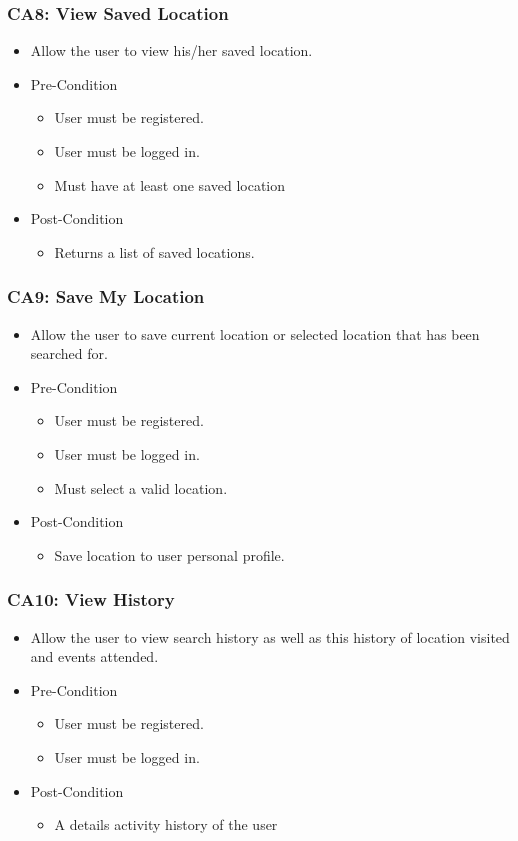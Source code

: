 \documentclass[12pt,a4paper]{article}
\begin{document}
		\subsubsection{CA8: View Saved Location}
			\begin{itemize}
				\item Allow the user to view his/her saved location.
				\item Pre-Condition
					\begin{itemize}
						\item User must be registered.
						\item User must be logged in.
						\item Must have at least one saved location
					\end{itemize}
				\item Post-Condition
					\begin{itemize}
						\item Returns a list of saved locations.
					\end{itemize}
			\end{itemize}
		\subsubsection{CA9: Save My Location}
			\begin{itemize}
				\item Allow the user to save current location or selected location that has been searched for.
				\item Pre-Condition
					\begin{itemize}
						\item User must be registered.
						\item User must be logged in.
						\item Must select a valid location.
					\end{itemize}
				\item Post-Condition
					\begin{itemize}
						\item Save location to user personal profile.
					\end{itemize}
			\end{itemize}
		\subsubsection{CA10: View History}
			\begin{itemize}
				\item Allow the user to view search history as well as this history of location visited and events attended.
				\item Pre-Condition
					\begin{itemize}
						\item User must be registered.
						\item User must be logged in.
					\end{itemize}
				\item Post-Condition
					\begin{itemize}
						\item A details activity history of the user
					\end{itemize}
			\end{itemize}
\end{document}
